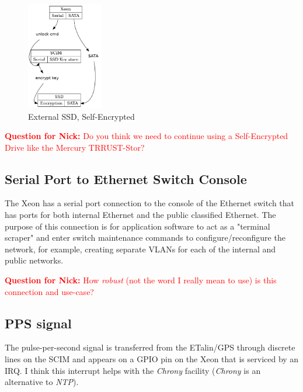 \documentclass[12pt]{article}
\begin{document}
\begin{figure}[H]
\begin{center}
\includegraphics[width=0.3\textwidth]{img/ssd}
\caption{External SSD, Self-Encrypted}
\label{fig:ssd}
\end{center}
\end{figure}

\textcolor{red}{\textbf{Question for Nick:} Do you think we need to
continue using a Self-Encrypted Drive like the Mercury TRRUST-Stor?}



\subsection{Serial Port to Ethernet Switch Console}
\label{section:switch_console}

The Xeon has a serial port connection to the console of the Ethernet switch that has ports for both internal Ethernet and the public classified Ethernet.
The purpose of this connection is for application software to act as a "terminal scraper" and enter switch maintenance commands to configure/reconfigure the network, for example, creating separate VLANs for each of the internal and public networks.

\textcolor{red}{\textbf{Question for Nick:} How \textit{robust} (not the word I really mean to use) is this connection and use-case?}



\subsection{PPS signal}
\label{section:pps}

The pulse-per-second signal is transferred from the ETalin/GPS through discrete lines on the SCIM and appears on a GPIO pin on the Xeon that is serviced by an IRQ.  I think this interrupt helps with the \textit{Chrony} facility (\textit{Chrony} is an alternative to \textit{NTP}).
\end{document}
